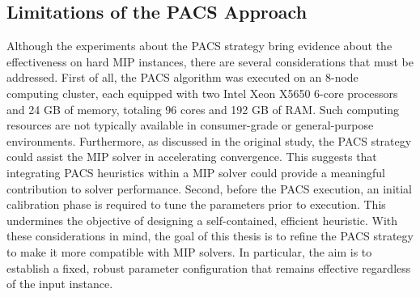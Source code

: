 \subsection{Limitations of the PACS Approach}
Although the experiments about the PACS strategy bring evidence about the effectiveness on hard MIP instances, there are several considerations that must be addressed.
First of all, the PACS algorithm was executed on an 8-node computing cluster, each equipped with two Intel Xeon X5650 6-core processors and 24 GB of memory, totaling 96 cores and 192 GB of RAM. Such computing resources are not typically available in consumer-grade or general-purpose environments. Furthermore, as discussed in the original study, the PACS strategy could assist the MIP solver in accelerating convergence. This suggests that integrating PACS heuristics within a MIP solver could provide a meaningful contribution to solver performance. 
Second, before the PACS execution, an initial calibration phase is required to tune the parameters prior to execution. This undermines the objective of designing a self-contained, efficient heuristic.
With these considerations in mind, the goal of this thesis is to refine the PACS strategy to make it more compatible with MIP solvers. In particular, the aim is to establish a fixed, robust parameter configuration that remains effective regardless of the input instance.
